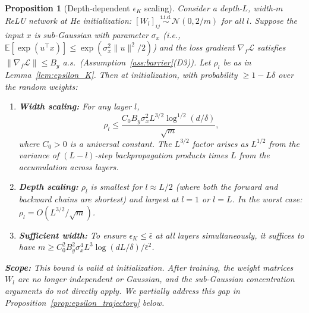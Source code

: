 \documentclass{article}
\providecommand{\E}{\mathbb{E}}
\providecommand{\norm}[1]{\lVert #1 \rVert}
\theoremstyle{plain}
\newtheorem{proposition}{Proposition}
\theoremstyle{definition}
\theoremstyle{remark}
\begin{document}
\begin{proposition}[Depth-dependent $\epsilon_K$ scaling]
\label{prop:epsilon_depth}
Consider a depth-$L$, width-$m$ ReLU network at He initialization: $[W_l]_{ij} \stackrel{\mathrm{i.i.d.}}{\sim} \mathcal{N}(0, 2/m)$ for all $l$. Suppose the input $x$ is sub-Gaussian with parameter $\sigma_x$ (i.e., $\E[\exp(u^\top x)] \leq \exp(\sigma_x^2\norm{u}^2/2)$) and the loss gradient $\nabla_f\mathcal{L}$ satisfies $\norm{\nabla_f\mathcal{L}} \leq B_y$ a.s.\ (Assumption~\ref{ass:barrier}(D3)). Let $\rho_l$ be as in Lemma~\ref{lem:epsilon_K}. Then at initialization, with probability $\geq 1 - L\delta$ over the random weights:
\begin{enumerate}
    \item[(a)] \textbf{Width scaling:} For any layer $l$,
    \begin{equation}
        \rho_l \leq \frac{C_0 B_y \sigma_x^2 L^{3/2} \log^{1/2}(d/\delta)}{\sqrt{m}},
    \end{equation}
    where $C_0 > 0$ is a universal constant. The $L^{3/2}$ factor arises as $L^{1/2}$ from the variance of $(L\!-\!l)$-step backpropagation products \citep{vershynin2018high} times $L$ from the accumulation across layers.
    \item[(b)] \textbf{Depth scaling:} $\rho_l$ is smallest for $l \approx L/2$ (where both the forward and backward chains are shortest) and largest at $l = 1$ or $l = L$. In the worst case: $\rho_l = O(L^{3/2}/\sqrt{m})$.
    \item[(c)] \textbf{Sufficient width:} To ensure $\epsilon_K \leq \bar{\epsilon}$ at all layers simultaneously, it suffices to have $m \geq C_0^2 B_y^2 \sigma_x^4 L^3 \log(dL/\delta) / \bar{\epsilon}^2$.
\end{enumerate}
\textbf{Scope:} This bound is valid at initialization. After training, the weight matrices $W_l$ are no longer independent or Gaussian, and the sub-Gaussian concentration arguments do not directly apply. We partially address this gap in Proposition~\ref{prop:epsilon_trajectory} below.
\end{proposition}
\end{document}
